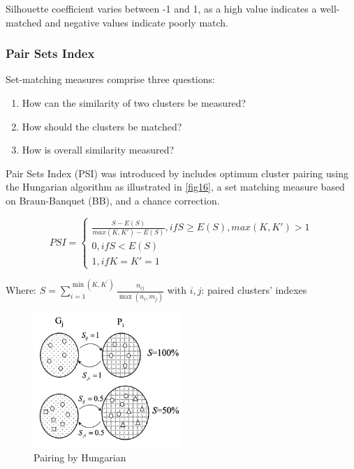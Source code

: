 \documentclass[a4paper, 12pt]{article}
\begin{document}
Silhouette coefficient varies between -1 and 1, as a high value indicates a well-matched and negative values indicate poorly match.

\subsubsection{Pair Sets Index}

Set-matching measures comprise three questions:
\begin{enumerate}
    \item How can the similarity of two clusters be measured? 
    \item How should the clusters be matched? 
    \item How is overall similarity measured? 
\end{enumerate}

Pair Sets Index (PSI) was introduced by \citep{rezaei2016set} includes optimum cluster pairing using the Hungarian algorithm \citep{kuhn1955hungarian} as illustrated in \autoref{fig16}, a set matching measure based on Braun-Banquet (BB), and a chance correction.

\begin{equation} \label{eq16}
    PSI = \begin{cases}
            \frac{S-E(S)}{max(K,K')-E(S)}, if S \geq E(S), max(K, K') > 1 \\
            0, if S < E(S)\\
            1, if K = K' = 1
        \end{cases}
\end{equation}

Where: $S=\sum_{i=1}^{\min \left(K, K^{\prime}\right)} \frac{n_{i j}}{\max \left(n_{i}, m_{j}\right)}$ with $i, j$: paired clusters' indexes 

\begin{figure}[bp!]
    \centering
    \includegraphics[width=0.5\textwidth]{Hungarian.png}
    \caption{Pairing by Hungarian}
    \label{fig16}
\end{figure}
\end{document}

